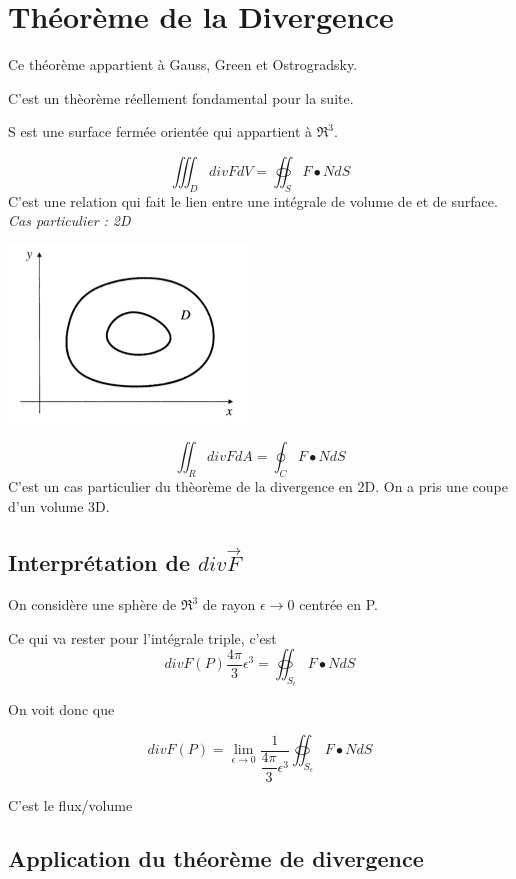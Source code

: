 \section{Théorème de la Divergence}
Ce théorème appartient à Gauss, Green et Ostrogradsky.

C'est un thèorème réellement fondamental pour la suite. %

S est une surface fermée orientée qui appartient à $\Re^3$.

\[\iiint_D div F dV = \oiint_S F \bullet N dS\]
C'est une relation qui fait le lien entre une intégrale de volume de et de surface.
\textit{
Cas particulier : 2D}

\begin{center}
\includegraphics[scale=0.5]{image5.png}\\

\end{center}

\[\iint _R div F dA = \oint _C F \bullet N dS\]
C'est un cas particulier du thèorème de la divergence en 2D. On a pris une coupe d'un volume 3D.

\subsection{Interprétation de $div \vec F$}

On considère une sphère de $\Re ^3$ de rayon $\epsilon \to 0$ centrée en P.

Ce qui va rester pour l'intégrale triple, c'est
\[div F(P) \dfrac{4\pi}{3} \epsilon^3 = \oiint _{S_{\epsilon}} F \bullet N dS \]

On voit donc que

$$div F (P) =  \lim_{\epsilon \to 0 } \frac{1}{\dfrac{4\pi}{3} \epsilon^3} \oiint _{S_{\epsilon}} F \bullet N dS $$

C'est le flux/volume

\subsection{Application du théorème de divergence}

